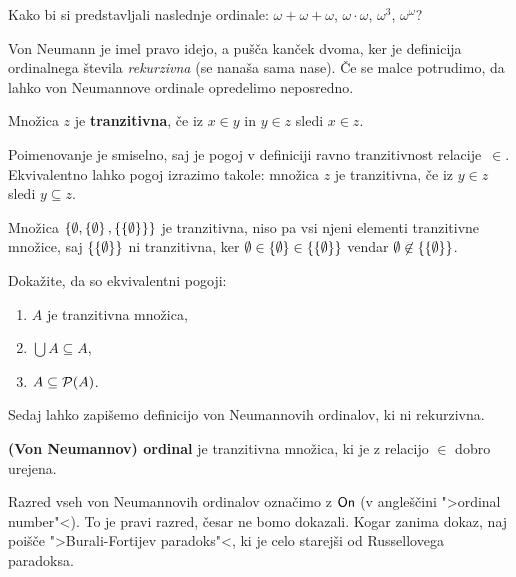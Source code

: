 \begin{naloga}
  Kako bi si predstavljali naslednje ordinale: $\omega + \omega + \omega$, $\omega \cdot \omega$, $\omega^3$, $\omega^\omega$?
\end{naloga}

Von Neumann je imel pravo idejo, a pušča kanček dvoma, ker je definicija ordinalnega števila \emph{rekurzivna} (se nanaša sama nase). Če se malce potrudimo, da lahko von Neumannove ordinale opredelimo neposredno.

\begin{definicija}
  Množica $z$ je \textbf{tranzitivna}, če iz $x \in y$ in $y \in z$ sledi $x \in z$.
\end{definicija}

\noindent
%
Poimenovanje je smiselno, saj je pogoj v definiciji ravno tranzitivnost relacije~$\in$.
Ekvivalentno lahko pogoj izrazimo takole: množica $z$ je tranzitivna, če iz $y \in z$ sledi $y \subseteq z$.

\begin{primer}
  Množica $\left\{\emptyset, \left\{\emptyset\right\}, \left\{\left\{\emptyset\right\}\right\}\right\}$ je tranzitivna, niso pa vsi njeni elementi tranzitivne množice, saj $\left\{\left\{\emptyset\right\}\right\}$ ni tranzitivna, ker $\emptyset \in \left\{\emptyset\right\} \in \left\{\left\{\emptyset\right\}\right\}$ vendar $\emptyset \not\in \left\{\left\{\emptyset\right\}\right\}$.
\end{primer}

\begin{naloga}
  Dokažite, da so ekvivalentni pogoji:
  \begin{enumerate}
  \item $A$ je tranzitivna množica,
  \item $\bigcup A \subseteq A$,
  \item $A \subseteq \mathcal{P}(A)$.
  \end{enumerate}
\end{naloga}

Sedaj lahko zapišemo definicijo von Neumannovih ordinalov, ki ni rekurzivna.

\begin{definicija}
  \label{def:von-neuman-ordinal}
  \textbf{(Von Neumannov) ordinal} je tranzitivna množica, ki je z relacijo $\in$ dobro urejena.
\end{definicija}

Razred vseh von Neumannovih ordinalov označimo z $\mathsf{On}$ (v angleščini ">ordinal number"<). To je pravi razred, česar ne bomo dokazali. Kogar zanima dokaz, naj poišče ">Burali-Fortijev paradoks"<, ki je celo starejši od Russellovega paradoksa.

